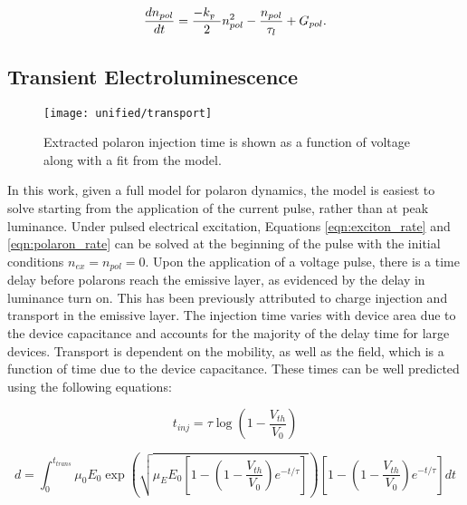 \documentclass[../thesis.tex]{subfiles}
\begin{document}
\begin{equation}
\frac{dn_{pol}}{dt}=\frac{-k_{_\text{\tiny F}}\ }{2}n_{pol}^2-\frac{n_{pol}}{\tau_l}+G_{pol}.
\label{eqn:polaron_rate}
\end{equation}

\subsection{Transient Electroluminescence} \label{sec:transient_el}

\begin{wrapfigure}{R}{0.5\textwidth}
\centering
\texttt{[image: unified/transport]}
\caption{Extracted polaron injection time is shown as a function of voltage along with a fit from the model.}
\label{fig:transport}
\end{wrapfigure}

In this work, given a full model for polaron dynamics, the model is easiest to solve starting from the application of the current pulse, rather than at peak luminance.
Under pulsed electrical excitation, Equations \ref{eqn:exciton_rate} and \ref{eqn:polaron_rate} can be solved at the beginning of the pulse with the initial conditions $n_{ex}=n_{pol}=0$.  
Upon the application of a voltage pulse, there is a time delay before polarons reach the emissive layer, as evidenced by the delay in luminance turn on.  
This has been previously attributed to charge injection and transport in the emissive layer.\supercite{Wei2004}
The injection time varies with device area due to the device capacitance and accounts for the majority of the delay time for large devices.
Transport is dependent on the mobility, as well as the field, which is a function of time due to the device capacitance.  
These times can be well predicted using the following equations:\supercite{Wei2004}

\begin{equation}
t_{inj}=\tau\log\left(1-\frac{V_{th}}{V_0}\right)
\end{equation}

\begin{equation}
d=\int_0^{t_{trans}}\mu_0 E_0 \exp \left( \sqrt{\mu_{E}E_0\left[1-\left(1-\frac{V_{th}}{V_0}\right)e^{-t/\tau}\right]}\right)\left[1-\left(1-\frac{V_{th}}{V_0}\right)e^{-t/\tau}\right] dt
\end{equation}
\end{document}
